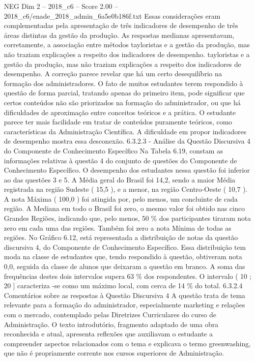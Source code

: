 \begin{textsample}{NEG Dim 2 – 2018\_c6 – Score 2.00 – 2018\_c6/enade\_2018\_admin\_6a5e0b186f.txt}
Essas considerações eram complementadas pela apresentação de três indicadores de desempenho de três áreas distintas da gestão da produção.
As respostas medianas apresentavam, corretamente, a associação entre métodos tayloristas e a gestão da produção, mas não traziam explicações a respeito dos indicadores de desempenho. tayloristas e a gestão da produção, mas não traziam explicações a respeito dos indicadores de desempenho.
A correção parece revelar que há um certo desequilíbrio na formação dos administradores.
O fato de muitos estudantes terem respondido à questão de forma parcial, tratando apenas do primeiro item, pode significar que certos conteúdos não são priorizados na formação do administrador, ou que há dificuldades de aproximação entre conceitos teóricos e a prática.
O estudante parece ter mais facilidade em tratar de conteúdos puramente teóricos, como características da Administração Científica.
A dificuldade em propor indicadores de desempenho mostra essa desconexão. 6.3.2.3 - Análise da Questão Discursiva 4 do Componente de Conhecimento Específico Na Tabela 6.19, constam as informações relativas à questão 4 do conjunto de questões do Componente de Conhecimento Específico.
O desempenho dos estudantes nessa questão foi inferior ao das questões 3 e 5.
A Média geral do Brasil foi 14,2, sendo a maior Média registrada na região Sudeste ( 15,5 ), e a menor, na região Centro-Oeste ( 10,7 ).
A nota Máxima ( 100,0 ) foi atingida por, pelo menos, um concluinte de cada região.
A Mediana em todo o Brasil foi zero, o mesmo valor foi obtido nas cinco Grandes Regiões, indicando que, pelo menos, 50 \% dos participantes tiraram nota zero em cada uma das regiões.
Também foi zero a nota Mínima de todas as regiões.
No Gráfico 6.12, está representada a distribuição de notas da questão discursiva 4, do Componente de Conhecimento Específico.
Essa distribuição tem moda na classe de estudantes que, tendo respondido à questão, obtiveram nota 0,0, seguida da classe de alunos que deixaram a questão em branco.
A soma das frequências destes dois intervalos supera 63 \% dos respondentes.
O intervalo ( 10 ; 20 ] caracteriza -se como um máximo local, com cerca de 14 \% do total. 6.3.2.4 Comentários sobre as respostas à Questão Discursiva 4 A questão trata de tema relevante para a formação do administrador, especialmente marketing e relações com o mercado, contemplado pelas Diretrizes Curriculares do curso de Administração.
O texto introdutório, fragmento adaptado de uma obra reconhecida e atual, apresenta reflexões que auxiliavam o estudante a compreender aspectos relacionados com o tema e explicava o termo greenwashing, que não é propriamente corrente nos cursos superiores de Administração.

\end{textsample}
